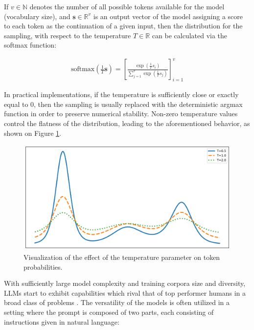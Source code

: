 \documentclass[UTF8,noindent,nohyp,parspace,titlepage,twoside,12pt]{article}
\begin{document}
      If $v \in \mathbb{N}$ denotes the number of all possible tokens available
      for the model (vocabulary size), and $\mathbf{s} \in \mathbb{R}^v$ is an
      output vector of the model assigning a score to each token as the
      continuation of a given input, then the distribution for the sampling,
      with respect to the temperature $T \in \mathbb{R}$ can be calculated
      via the softmax function:

      \begin{align} \label{eqsoftmax}
        \text{softmax}\left(\frac{1}{T} \mathbf{s}\right)
          = \left[
              \frac{\exp(\frac{1}{T} s_i)}{\sum_{j=1}^v \exp(\frac{1}{T} s_j)}
            \right]_{i=1}^v
      \end{align}

      In practical implementations, if the temperature is sufficiently close or
      exactly equal to $0$, then the sampling is usually replaced with the
      deterministic argmax function in order to preserve numerical stability.
      Non-zero temperature values control the flatness of the distribution,
      leading to the aforementioned behavior, as shown on Figure
      \ref{figtemperature}.

      \begin{figure}[hbtp]
        \includegraphics[width=\textwidth]{softmax-temperature}
        \caption{%
          Visualization of the effect of the temperature parameter on token
          probabilities.
        }
        \label{figtemperature}
      \end{figure}

      With sufficiently large model complexity and training corpora size and
      diversity, LLMs start to exhibit capabilities which rival that of top
      performer humans in a broad class of problems \cite{gpt3,gpt4}. The
      versatility of the models is often utilized in a setting where the prompt
      is composed of two parts, each consisting of instructions given in
      natural language:
\end{document}
